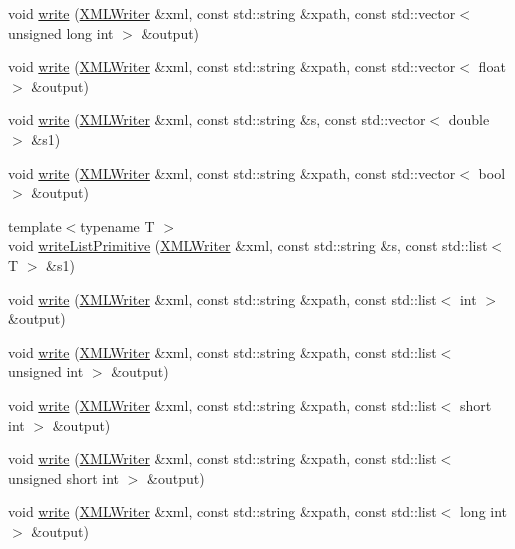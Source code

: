 \begin{DoxyCompactItemize}
void \mbox{\hyperlink{group__io_gaddbbc6b8d1fa2d88b2b7d0ecd3e36884}{write}} (\mbox{\hyperlink{classADATXML_1_1XMLWriter}{X\+M\+L\+Writer}} \&xml, const std\+::string \&xpath, const std\+::vector$<$ unsigned long int $>$ \&output)
\item 
void \mbox{\hyperlink{group__io_ga21089f03811e37a0d78c969c6a611f59}{write}} (\mbox{\hyperlink{classADATXML_1_1XMLWriter}{X\+M\+L\+Writer}} \&xml, const std\+::string \&xpath, const std\+::vector$<$ float $>$ \&output)
\item 
void \mbox{\hyperlink{group__io_gab54b00e1a7cbc507061351d54d6de9fe}{write}} (\mbox{\hyperlink{classADATXML_1_1XMLWriter}{X\+M\+L\+Writer}} \&xml, const std\+::string \&s, const std\+::vector$<$ double $>$ \&s1)
\item 
void \mbox{\hyperlink{group__io_ga5ca658ba9d302064625a4be34293839a}{write}} (\mbox{\hyperlink{classADATXML_1_1XMLWriter}{X\+M\+L\+Writer}} \&xml, const std\+::string \&xpath, const std\+::vector$<$ bool $>$ \&output)
\item 
{\footnotesize template$<$typename T $>$ }\\void \mbox{\hyperlink{namespaceADATXML_a5b78d711d4d08d62696771f2f4187384}{write\+List\+Primitive}} (\mbox{\hyperlink{classADATXML_1_1XMLWriter}{X\+M\+L\+Writer}} \&xml, const std\+::string \&s, const std\+::list$<$ T $>$ \&s1)
\item 
void \mbox{\hyperlink{group__io_gaab9fb8d6cd603f8b6b5c6b493935eade}{write}} (\mbox{\hyperlink{classADATXML_1_1XMLWriter}{X\+M\+L\+Writer}} \&xml, const std\+::string \&xpath, const std\+::list$<$ int $>$ \&output)
\item 
void \mbox{\hyperlink{group__io_ga6026879ab5fc4a25f24c2f9f88d731b5}{write}} (\mbox{\hyperlink{classADATXML_1_1XMLWriter}{X\+M\+L\+Writer}} \&xml, const std\+::string \&xpath, const std\+::list$<$ unsigned int $>$ \&output)
\item 
void \mbox{\hyperlink{group__io_ga9e8def0c78f0db9648bdf8a6ef4b0832}{write}} (\mbox{\hyperlink{classADATXML_1_1XMLWriter}{X\+M\+L\+Writer}} \&xml, const std\+::string \&xpath, const std\+::list$<$ short int $>$ \&output)
\item 
void \mbox{\hyperlink{group__io_ga9b4ce3375767d9485b3d5dcbf535d4a4}{write}} (\mbox{\hyperlink{classADATXML_1_1XMLWriter}{X\+M\+L\+Writer}} \&xml, const std\+::string \&xpath, const std\+::list$<$ unsigned short int $>$ \&output)
\item 
void \mbox{\hyperlink{group__io_ga323fbb7d576696f27ec4eb34519c1fc7}{write}} (\mbox{\hyperlink{classADATXML_1_1XMLWriter}{X\+M\+L\+Writer}} \&xml, const std\+::string \&xpath, const std\+::list$<$ long int $>$ \&output)

\end{DoxyCompactItemize}
